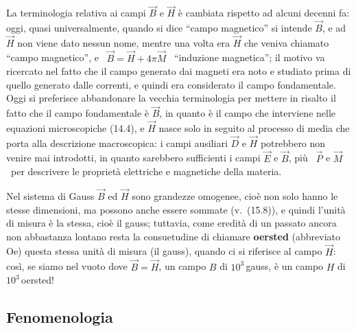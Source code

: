La terminologia relativa ai campi $\vec B$ e $\vec H$ \`e cambiata rispetto ad
alcuni decenni fa: oggi, quasi universalmente, quando si dice ``campo
magnetico'' si intende $\vec B$, e ad $\vec H$ non viene dato nessun nome,
mentre una volta era $\vec H$ che veniva chiamato ``campo magnetico'', e
\ $\vec B=\vec H+4\pi\vec M$ \ ``induzione magnetica''; il motivo va ricercato
nel fatto che il campo generato dai magneti era noto e studiato prima di quello
generato dalle correnti, e quindi era considerato il campo fondamentale. Oggi si
preferisce abbandonare la vecchia terminologia per mettere in risalto il fatto
che il campo fondamentale \`e $\vec B$, in quanto \`e il campo che interviene
nelle equazioni microscopiche (14.4), e $\vec H$ nasce solo in seguito al
processo di media che porta alla descrizione macroscopica: i campi ausiliari
$\vec D$ e $\vec H$ potrebbero non venire mai introdotti, in quanto sarebbero
sufficienti i campi $\vec E$ e $\vec B$, pi\`u \ $\vec P$ e $\vec M$ \ per
descrivere le propriet\`a elettriche e magnetiche della materia.

Nel sistema di Gauss $\vec B$ ed $\vec H$ sono grandezze omogenee, cio\`e non
solo hanno le stesse dimensioni, ma possono anche essere sommate
\big(v.\ (15.8)\big), e quindi l'unit\`a di misura \`e la stessa, cio\`e il
gauss; tuttavia, come eredit\`a di un passato ancora non abbastanza lontano
resta la consuetudine di chiamare \textbf{oersted} (abbreviato Oe) questa stessa
unit\`a di misura (il gauss), quando ci si riferisce al campo $\vec H$: cos\`i,
se siamo nel vuoto dove $\vec B=\vec H$, un campo $B$ di $10^3$\,gauss, \`e un
campo $H$ di $10^3$\,oersted!

\subsection{Fenomenologia}


